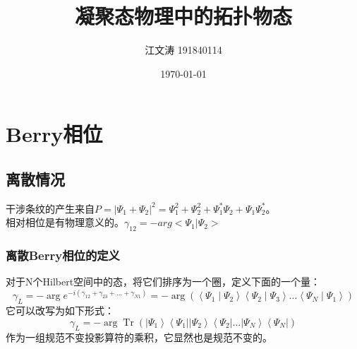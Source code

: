 \documentclass[12pt, a4paper, oneside]{ctexbook}
\title{{\Huge{\textbf{凝聚态物理中的拓扑物态}}}\\}
\author{江文涛 191840114}
\date{\today}
\begin{document}
	\maketitle
	
	\setcounter{page}{1}
	\newpage
	\setcounter{page}{1}
	\tableofcontents
	\newpage
	\setcounter{page}{1}

    \chapter{Berry相位}
    \section{离散情况}
    干涉条纹的产生来自$ P=|\Psi_1+\Psi_2|^2=\Psi_1^2+\Psi_2^2+\Psi_1^*\Psi_2+\Psi_1\Psi_2^* $。\\

    相对相位是有物理意义的。$ \gamma_{12}=-arg<\Psi_1|\Psi_2> $ 
	\subsection*{离散Berry相位的定义}
	对于N个Hilbert空间中的态，将它们排序为一个圈，定义下面的一个量：
	\begin{equation}
		\gamma_L=-\arg e^{-i\left(\gamma_{12}+\gamma_{23}+\ldots+\gamma_{N1}\right)}=-\arg \left(\left\langle\Psi_1 \mid \Psi_2\right\rangle\left\langle\Psi_2 \mid \Psi_3\right\rangle \ldots\left\langle\Psi_N \mid \Psi_1\right\rangle\right)
	\end{equation}
	它可以改写为如下形式：
	\begin{equation}
		\gamma_L=-\arg \operatorname{Tr}\left(\left|\Psi_1\right\rangle\left\langle\Psi_1|| \Psi_2\right\rangle\left\langle\Psi_2|\ldots| \Psi_N\right\rangle\left\langle\Psi_N\right|\right)
	\end{equation}
	作为一组规范不变投影算符的乘积，它显然也是规范不变的。
\end{document}
